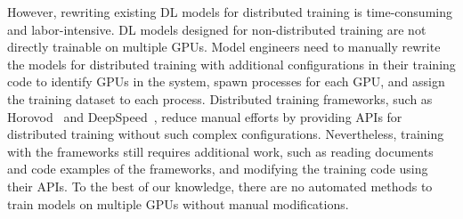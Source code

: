 However, rewriting existing DL models for distributed training is
time-consuming and labor-intensive.
DL models designed for non-distributed training are not directly trainable on
multiple GPUs. 
Model engineers need to manually rewrite the models for distributed training
with additional configurations in their training code to identify GPUs in the
system, spawn processes for each GPU, and assign the training dataset to each
process.
Distributed training frameworks, such as Horovod~\cite{sergeev2018horovod} and
DeepSpeed~\cite{deepspeed}, reduce manual efforts by providing APIs for
distributed training without such complex configurations.
Nevertheless, training with the frameworks still requires additional work, such
as reading documents and code examples of the frameworks, and
modifying the training code using their APIs.
To the best of our knowledge, there are no automated methods to train models on
multiple GPUs without manual modifications.




